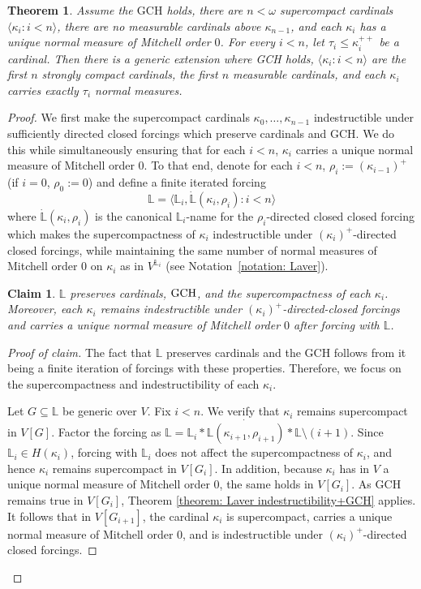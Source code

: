 \documentclass[11pt]{amsart}
\newtheorem{theorem}{Theorem}[section]
\newtheorem{claim}{Claim}[theorem]
\theoremstyle{definition}
\theoremstyle{remark}
\newcommand\<{{<}}
\begin{document}
\begin{theorem}\label{thm: IdentityCrises + Normal measures}
    Assume the $\mathrm{GCH}$ holds, there are $n<\omega$ supercompact cardinals $\langle \kappa_i\colon i<n\rangle$, there are no measurable cardinals above $\kappa_{n-1}$,  and each $\kappa_i$ has a unique normal measure of Mitchell order $0$. For every $i<n$, let $\tau_i\leq\kappa^{++}_i$ be a cardinal. Then there is a generic extension where {\rm{GCH}} holds, $\langle \kappa_i\colon i<n\rangle$ are the first $n$ strongly compact cardinals, the first $n$ measurable cardinals,  and each $\kappa_i$ carries exactly $\tau_i$ normal measures.
\end{theorem}
\begin{proof}
We first make the supercompact cardinals $\kappa_0,\ldots, \kappa_{n-1}$ indestructible under sufficiently directed closed forcings which preserve cardinals and GCH. We do this while simultaneously ensuring that for each $i<n$, $\kappa_i$ carries a unique normal measure of Mitchell order $0$. To that end, denote for each $i<n$, $\rho_i := (\kappa_{i-1})^+$ (if $i=0$, $\rho_0 := 0$) and define a finite iterated forcing 
$$\mathbb{L} = \langle \mathbb{L}_i, \dot{\mathbb{L}}(\kappa_i, \rho_i)\colon i<n\rangle$$
where $\dot{\mathbb{L}}(\kappa_i,\rho_i)$ is the canonical $\mathbb{L}_i$-name for the $\rho_i$-directed closed closed forcing which makes the supercompactness of $\kappa_i$ indestructible under $(\kappa_i)^+$-directed closed forcings, while maintaining the same number of normal measures of Mitchell order $0$ on $\kappa_i$ as in $V^{\mathbb{L}_i}$ (see Notation~\ref{notation: Laver}).

\begin{claim}
    $\mathbb{L}$ preserves cardinals, $\rm{GCH}$, and the supercompactness of each $\kappa_i$.  Moreover, each $\kappa_i$ remains indestructible under $(\kappa_i)^+$-directed-closed forcings and carries a unique normal measure of Mitchell order $0$ after forcing with $\mathbb{L}$.
\end{claim}
\begin{proof}[Proof of claim]
The fact that $\mathbb{L}$ preserves cardinals and the GCH follows from it being a finite iteration of forcings with these properties. Therefore, we focus on the supercompactness and indestructibility of each $\kappa_i$. 

Let $G\subseteq \mathbb{L}$ be generic over $V$. Fix $i<n$. We verify that $\kappa_i$ remains supercompact in $V[G]$. Factor the forcing as
$\mathbb{L} = \mathbb{L}_i \ast \dot{\mathbb{L}(\kappa_{i+1},\rho_{i+1})} \ast \mathbb{L}\setminus (i+1)$.
Since $\mathbb{L}_i \in H(\kappa_i)$, forcing with $\mathbb{L}_i$ does not affect the supercompactness of $\kappa_i$, and hence $\kappa_i$ remains supercompact in $V[G_i]$. In addition, because $\kappa_i$ has in $V$ a unique normal measure of Mitchell order $0$, the same holds in $V[G_i]$.  As GCH remains true in $V[G_i]$, Theorem \ref{theorem: Laver indestructibility+GCH} applies. It follows that in $V[G_{i+1}]$, the cardinal $\kappa_i$ is supercompact, carries a unique normal measure of Mitchell order $0$, and is indestructible under $(\kappa_i)^+$-directed closed forcings.


\end{proof}
\end{proof}
\end{document}
